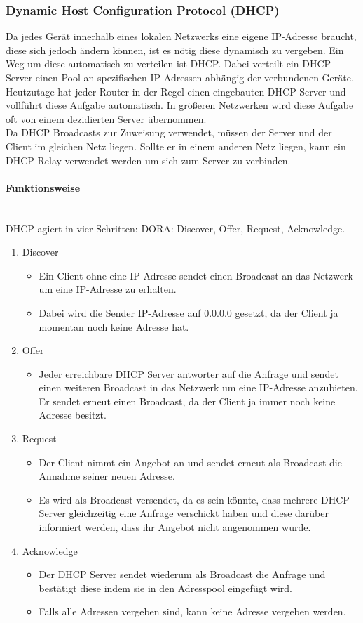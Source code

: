 \documentclass{article}
\newcommand{\paragraphlb}[1]{\paragraph{#1}\mbox{}\\}
\begin{document}
	 \subsubsection{Dynamic Host Configuration Protocol (DHCP)}
	 Da jedes Gerät innerhalb eines lokalen Netzwerks eine eigene IP-Adresse braucht, diese sich jedoch ändern können, ist es nötig diese dynamisch zu vergeben. Ein Weg um diese automatisch zu verteilen ist DHCP. Dabei verteilt ein DHCP Server einen Pool an spezifischen IP-Adressen abhängig der verbundenen Geräte. Heutzutage hat jeder Router in der Regel einen eingebauten DHCP Server und vollführt diese Aufgabe automatisch. In größeren Netzwerken wird diese Aufgabe oft von einem dezidierten Server übernommen. \\
	 Da DHCP Broadcasts zur Zuweisung verwendet, müssen der Server und der Client im gleichen Netz liegen. Sollte er in einem anderen Netz liegen, kann ein DHCP Relay verwendet werden um sich zum Server zu verbinden. \\
	 \paragraphlb{Funktionsweise}
	 DHCP agiert in vier Schritten: DORA: Discover, Offer, Request, Acknowledge.
	 \begin{enumerate}
	 	\item{Discover}
	 	\begin{itemize}
	 		\item{Ein Client ohne eine IP-Adresse sendet einen Broadcast an das Netzwerk um eine IP-Adresse zu erhalten.}
	 		\item{Dabei wird die Sender IP-Adresse auf 0.0.0.0 gesetzt, da der Client ja momentan noch keine Adresse hat.}
	 	\end{itemize}
	 	\item{Offer}
	 	\begin{itemize}
	 		\item{Jeder erreichbare DHCP Server antworter auf die Anfrage und sendet einen weiteren Broadcast in das Netzwerk um eine IP-Adresse anzubieten. Er sendet erneut einen Broadcast, da der Client ja immer noch keine Adresse besitzt.}
	 	\end{itemize}
	 	\item{Request}
	 	\begin{itemize}
	 		\item{Der Client nimmt ein Angebot an und sendet erneut als Broadcast die Annahme seiner neuen Adresse.}
	 		\item{Es wird als Broadcast versendet, da es sein könnte, dass mehrere DHCP-Server gleichzeitig eine Anfrage verschickt haben und diese darüber informiert werden, dass ihr Angebot nicht angenommen wurde.}
	 	\end{itemize}
	 	\item{Acknowledge}
	 	\begin{itemize}
	 		\item{Der DHCP Server sendet wiederum als Broadcast die Anfrage und bestätigt diese indem sie in den Adresspool eingefügt wird.}
	 		\item{Falls alle Adressen vergeben sind, kann keine Adresse vergeben werden.}
	 	\end{itemize}
	 \end{enumerate}
\end{document}
